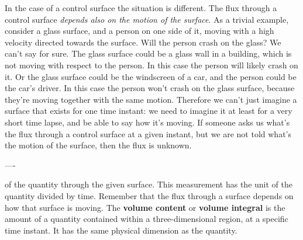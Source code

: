 % 
%
In the case of a control surface the situation is different. The flux through a control surface \emph{depends also on the motion of the surface}. As a trivial example, consider a glass surface, and a person on one side of it, moving with a high velocity directed towards the surface. Will the person crash on the glass? We can't say for sure. The glass surface could be a glass wall in a building, which is not moving with respect to the person. In this case the person will likely crash on it. Or the glass surface could be the windscreen of a car, and the person could be the car's driver. In this case the person won't crash on the glass surface, because they're moving together with the same motion. Therefore we can't just imagine a surface that exists for one time instant: we need to imagine it at least for a very short time lapse, and be able to say how it's moving. If someone asks us what's the flux through a control surface at a given instant, but we are not told what's the motion of the surface, then the flux is unknown.




----

  of the quantity through the given surface. This measurement has the unit of the quantity divided by time. Remember that the flux through a surface depends on how that surface is moving.
  The \textbf{volume content} or \textbf{volume integral} is the amount of a quantity contained within a three-dimensional region, at a specific time instant. It has the same physical dimension as the quantity.

